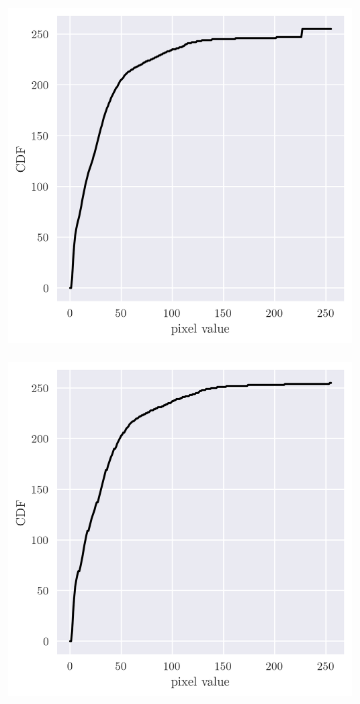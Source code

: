 \documentclass[12pt,a4paper]{article}
\begin{document}
\begin{figure}[htb]
	\begin{subfigure}[h!]{0.24\textwidth}
		\centering
		\includegraphics[width=\textwidth]{orig_cdf.png}
		\caption{}
		\label{fig:orig-cdf}
	\end{subfigure}
	\begin{subfigure}[h!]{0.24\textwidth}
		\centering
		\includegraphics[width=\textwidth]{cs_cdf.png}

\end{subfigure}
\end{figure}
\end{document}
